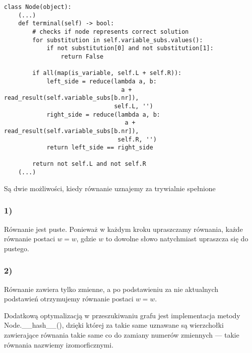 \documentclass[leqno, 12pt]{article}
\begin{document}
\begin{verbatim}
class Node(object):
    (...)
    def terminal(self) -> bool:
        # checks if node represents correct solution
        for substitution in self.variable_subs.values():
            if not substitution[0] and not substitution[1]:
                return False

        if all(map(is_variable, self.L + self.R)):
            left_side = reduce(lambda a, b:
                                 a + read_result(self.variable_subs[b.nr]),
                               self.L, '')
            right_side = reduce(lambda a, b:
                                  a + read_result(self.variable_subs[b.nr]),
                                self.R, '')
            return left_side == right_side

        return not self.L and not self.R
    (...)
\end{verbatim}

Są dwie możliwości, kiedy równanie uznajemy za trywialnie spełnione
\subsubsection*{1)}
Równanie jest puste. Ponieważ w każdym kroku upraszczamy równania, każde równanie postaci $w=w$, gdzie $w$ to dowolne słowo natychmiast upraszcza się do pustego.

\subsubsection*{2)}
Równanie zawiera tylko zmienne, a po podstawieniu za nie aktualnych podstawień otrzymujemy równanie postaci $w=w$. \newline\newline

Dodatkową optymalizacją w przeszukiwaniu grafu jest implementacja metody Node.\_\_hash\_\_(), dzięki której za takie same uznawane są wierzchołki zawierające równania takie same co do zamiany numerów zmiennych --- takie równania nazwiemy izomorficznymi.
\end{document}
